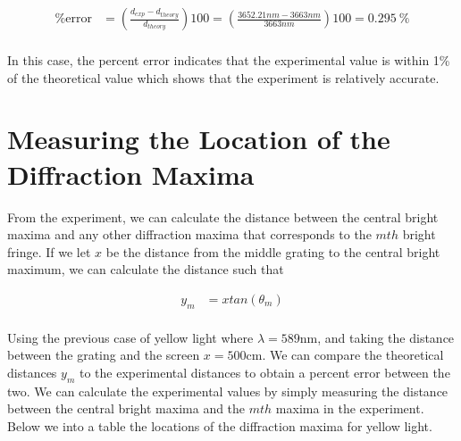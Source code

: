\documentclass[12pt]{article}
\begin{document}
\begin{equation}
    \begin{split}
        \text{\% error} &= \left( \frac{d_{exp} - d_{theory}}{d_{theory}} \right) 100 = \left( \frac{3652.21nm - 3663nm}{3663nm} \right) 100 = \SI{0.295}{\percent} \\
    \end{split}
\end{equation}

In this case, the percent error indicates that the experimental value is within 1\% of the theoretical value which shows that the experiment is relatively accurate.

\section{Measuring the Location of the Diffraction Maxima}
From the experiment, we can calculate the distance between the central bright maxima and any other diffraction maxima that corresponds to the $mth$ bright fringe. If we let $x$ be the distance from the middle grating to the central bright maximum, we can calculate the distance such that

\begin{equation}
    \begin{split}
        y_m &= xtan(\theta_m) \\
    \end{split}
\end{equation}

Using the previous case of yellow light where $\lambda = 589$nm, and taking the distance between the grating and the screen $x=500$cm. We can compare the theoretical distances $y_m$ to the experimental distances to obtain a percent error between the two. We can calculate the experimental values by simply measuring the distance between the central bright maxima and the $mth$ maxima in the experiment. Below we into a table the locations of the diffraction maxima for yellow light.

\setlength{\tabcolsep}{4pt}
\renewcommand{\arraystretch}{1.2}
\end{document}
